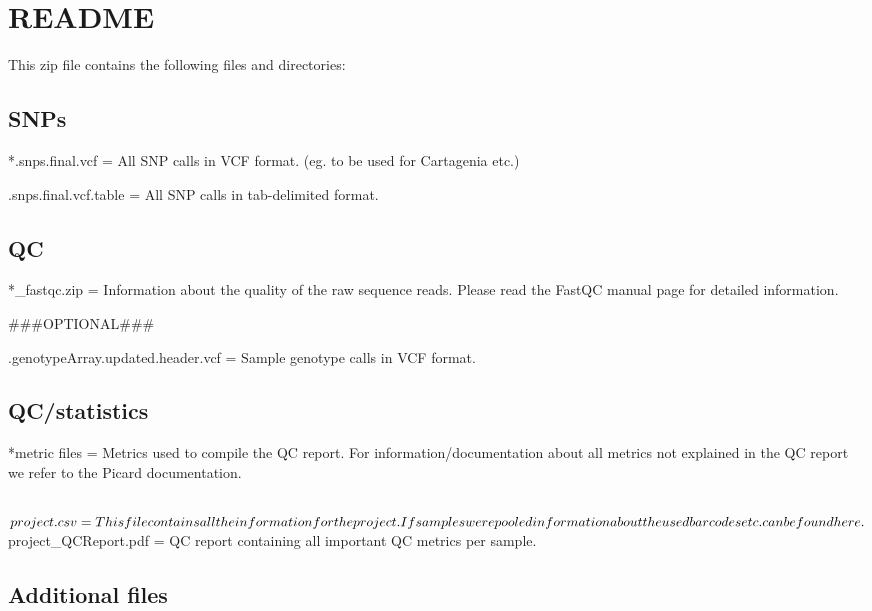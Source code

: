 \documentclass[a4paper,12pt]{article}
\begin{document}
\thispagestyle{empty}
\vspace{40mm}


\clearpage
\section*{README}

This zip file contains the following files and directories:
\subsection*{SNPs}
*.snps.final.vcf = All SNP calls in VCF format. (eg. to be used for Cartagenia etc.)

\noindent*.snps.final.vcf.table = All SNP calls in tab-delimited format.

\subsection*{QC}
*_fastqc.zip = Information about the quality of the raw sequence reads. Please read the FastQC manual page for detailed information.

\#\#\#OPTIONAL\#\#\#

\noindent*.genotypeArray.updated.header.vcf = Sample genotype calls in VCF format.


\subsection*{QC/statistics}
*metric files = Metrics used to compile the QC report. For information/documentation about all metrics not explained in the QC report we refer to the Picard documentation.


\subsection*{}


${project}.csv = This file contains all the information for the project. If samples were pooled information about the used barcodes etc. can be found here.

\noindent ${project}_QCReport.pdf = QC report containing all important QC metrics per sample.


\subsection*{}


\subsection*{Additional files}
\end{document}
